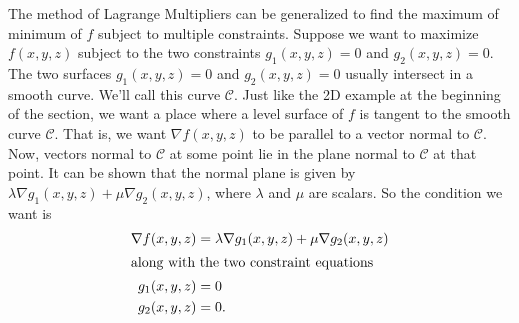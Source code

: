 The method of Lagrange Multipliers can be generalized to find the maximum of minimum of $f$ subject to multiple constraints.  Suppose we want to maximize $f(x,y,z)$ subject to the two constraints $g_1(x,y,z) = 0$ and $g_2(x,y,z) = 0.$  The two surfaces $g_1(x,y,z) = 0$ and $g_2(x,y,z) = 0$ usually intersect in a smooth curve.  We'll call this curve $\mathcal{C}$. Just like the 2D example at the beginning of the section, we want a place where a level surface of $f$ is tangent to the smooth curve $\mathcal{C}$. That is, we want $\nabla f(x,y,z)$ to be parallel to a vector normal to $\mathcal{C}$.  Now, vectors normal to $\mathcal{C}$ at some point lie in the plane normal to $\mathcal{C}$ at that point.  It can be shown that the normal plane is given by $\lambda \nabla g_1(x,y,z) + \mu \nabla g_2(x,y,z)$, where $\lambda$ and $\mu$ are scalars.  So the condition we want is 
	\begin{align*}
		\nabla f(x,y,z) & = \lambda \nabla g_1(x,y,z) + \mu \nabla g_2(x,y,z) \\ \intertext{along with the two constraint equations}
		g_1(x,y,z)      & =0                                                  \\
		g_2(x,y,z)      & =0.
	\end{align*}


